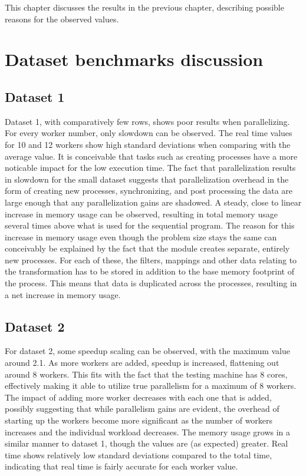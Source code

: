 This chapter discusses the results in the previous chapter, describing possible reasons for the observed values.

\section{Dataset benchmarks discussion}
\subsection{Dataset 1}
Dataset 1, with comparatively few rows, shows poor results when parallelizing. For every worker number, only slowdown can be observed.
The real time values for 10 and 12 workers show high standard deviations when comparing with the average value. It is conceivable that
tasks such as creating processes have a more noticable impact for the low execution time. The fact that parallelization results in
slowdown for the small dataset suggests that parallelization overhead in the form of creating new processes, synchronizing, and
post processing the data are large
enough that any parallelization gains are shadowed. A steady, close to linear increase in memory usage can be observed, resulting in
total memory usage several times above what is used for the sequential program. The reason for this increase in memory usage even though
the problem size stays the same can conceivably be explained by the fact that the  module creates separate, entirely
new processes. For each of these, the filters, mappings and other data relating to the transformation has to be stored in addition to the
base memory footprint of the process. This means that data is duplicated across the processes, resulting in a net increase in memory usage.

\subsection{Dataset 2}
For dataset 2, some speedup scaling can be observed, with the maximum value around 2.1. As more workers are added, speedup is increased,
flattening out around 8 workers. This fits with the fact that the testing machine has 8 cores, effectively making it able to utilize 
true parallelism for a maximum of 8 workers. The impact of adding more worker decreases with each one that is added, possibly suggesting
that while parallelism gains are evident, the overhead of starting up the workers become more significant as the number of workers increases
and the individual workload decreases. The memory usage grows in a similar manner to dataset 1, though the values are (as expected) greater.
Real time shows relatively low standard deviations compared to the total time, indicating that real time is fairly accurate for each worker
value.

